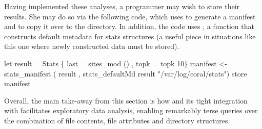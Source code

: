 Having implemented these analyses, a programmer may wish to store their
results.  She may do so via the following code, which
uses  to generate a manifest and 
to copy it over to the  directory.  In addition,
the code uses , a function
that constructs default metadata for stats structures
(a useful piece in situations 
like this one where newly constructed data must be stored).

\begin{code}
let result = Stats \{ last = sites_mod ()
                   , topk = topk 10\}
manifest <- stats_manifest 
  ( result
  , stats_defaultMd result "/var/log/coral/stats")
store manifest 
\end{code}




Overall, the main take-away from this section is how 
\forest{} and its tight integration with
\haskell{} facilitates exploratory data analysis,
enabling remarkably terse queries over the combination of file
contents, file attributes and directory structures.

